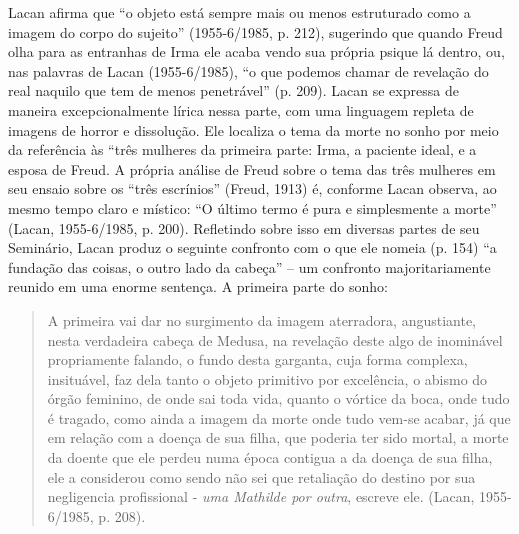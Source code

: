 Lacan afirma que ``o objeto está sempre mais ou menos estruturado como a
imagem do corpo do sujeito'' (1955-6/1985, p. 212), sugerindo que quando
Freud olha para as entranhas de Irma ele acaba vendo sua própria psique
lá dentro, ou, nas palavras de Lacan (1955-6/1985), ``o que podemos
chamar de revelação do real naquilo que tem de menos penetrável'' (p.
209). Lacan se expressa de maneira excepcionalmente lírica nessa parte,
com uma linguagem repleta de imagens de horror e dissolução. Ele
localiza o tema da morte no sonho por meio da referência às ``três
mulheres da primeira parte: Irma, a paciente ideal, e a esposa de Freud.
A própria análise de Freud sobre o tema das três mulheres em seu ensaio
sobre os ``três escrínios'' (Freud, 1913) é, conforme Lacan observa, ao
mesmo tempo claro e místico: ``O último termo é pura e simplesmente a
morte'' (Lacan, 1955-6/1985, p. 200). Refletindo sobre isso em diversas
partes de seu Seminário, Lacan produz o seguinte confronto com o que ele
nomeia (p. 154) ``a fundação das coisas, o outro lado da cabeça'' -- um
confronto majoritariamente reunido em uma enorme sentença. A primeira
parte do sonho:

\begin{quote}
A primeira vai dar no surgimento da imagem aterradora, angustiante,
nesta verdadeira cabeça de Medusa, na revelação deste algo de inominável
propriamente falando, o fundo desta garganta, cuja forma complexa,
insituável, faz dela tanto o objeto primitivo por excelência, o abismo
do órgão feminino, de onde sai toda vida, quanto o vórtice da boca, onde
tudo é tragado, como ainda a imagem da morte onde tudo vem-se acabar, já
que em relação com a doença de sua filha, que poderia ter sido mortal, a
morte da doente que ele perdeu numa época contigua a da doença de sua
filha, ele a considerou como sendo não sei que retaliação do destino por
sua negligencia profissional - \emph{uma Mathilde por outra}, escreve
ele. (Lacan, 1955-6/1985, p. 208).
\end{quote}

